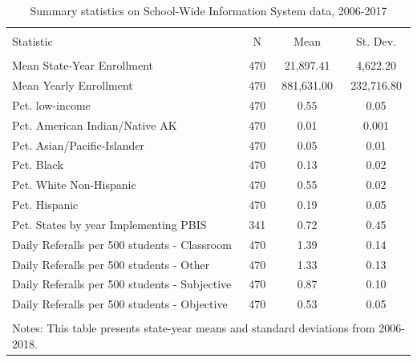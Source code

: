 
\begin{table}[!htbp] \centering 
  \caption{Summary statistics on School-Wide Information System data, 2006-2017} 
  \label{tab:descriptives} 
\begin{tabular}{@{\extracolsep{5pt}}lccc} 
\\[-1.8ex]\hline 
\hline \\[-1.8ex] 
Statistic & \multicolumn{1}{c}{N} & \multicolumn{1}{c}{Mean} & \multicolumn{1}{c}{St. Dev.} \\ 
\hline \\[-1.8ex] 
Mean State-Year Enrollment & 470 & 21,897.41 & 4,622.20 \\ 
Mean Yearly Enrollment & 470 & 881,631.00 & 232,716.80 \\ 
Pct. low-income & 470 & 0.55 & 0.05 \\ 
Pct. American Indian/Native AK & 470 & 0.01 & 0.001 \\ 
Pct. Asian/Pacific-Islander & 470 & 0.05 & 0.01 \\ 
Pct. Black & 470 & 0.13 & 0.02 \\ 
Pct. White Non-Hispanic & 470 & 0.55 & 0.02 \\ 
Pct. Hispanic & 470 & 0.19 & 0.05 \\ 
Pct. States by year Implementing PBIS & 341 & 0.72 & 0.45 \\ 
Daily Referalls per 500 students - Classroom & 470 & 1.39 & 0.14 \\ 
Daily Referalls per 500 students - Other & 470 & 1.33 & 0.13 \\ 
Daily Referalls per 500 students - Subjective & 470 & 0.87 & 0.10 \\ 
Daily Referalls per 500 students - Objective & 470 & 0.53 & 0.05 \\ 
\hline \\[-1.8ex] 
\multicolumn{4}{l}{Notes: This table presents state-year means and standard deviations from 2006-2018.} \\ 
\end{tabular} 
\end{table} 
